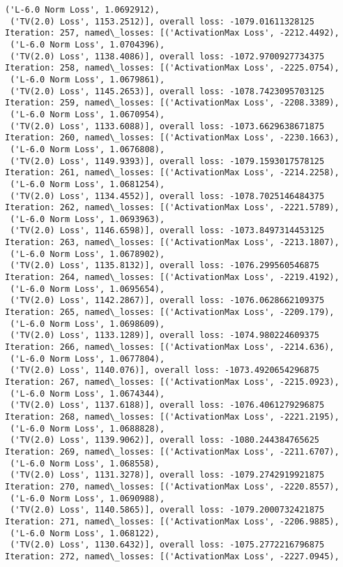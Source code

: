 \documentclass[10pt]{article}
\begin{document}
\begin{Verbatim}[commandchars=\\\{\}]
 ('L-6.0 Norm Loss', 1.0692912),
 ('TV(2.0) Loss', 1153.2512)], overall loss: -1079.01611328125
Iteration: 257, named\_losses: [('ActivationMax Loss', -2212.4492),
 ('L-6.0 Norm Loss', 1.0704396),
 ('TV(2.0) Loss', 1138.4086)], overall loss: -1072.9700927734375
Iteration: 258, named\_losses: [('ActivationMax Loss', -2225.0754),
 ('L-6.0 Norm Loss', 1.0679861),
 ('TV(2.0) Loss', 1145.2653)], overall loss: -1078.7423095703125
Iteration: 259, named\_losses: [('ActivationMax Loss', -2208.3389),
 ('L-6.0 Norm Loss', 1.0670954),
 ('TV(2.0) Loss', 1133.6088)], overall loss: -1073.6629638671875
Iteration: 260, named\_losses: [('ActivationMax Loss', -2230.1663),
 ('L-6.0 Norm Loss', 1.0676808),
 ('TV(2.0) Loss', 1149.9393)], overall loss: -1079.1593017578125
Iteration: 261, named\_losses: [('ActivationMax Loss', -2214.2258),
 ('L-6.0 Norm Loss', 1.0681254),
 ('TV(2.0) Loss', 1134.4552)], overall loss: -1078.7025146484375
Iteration: 262, named\_losses: [('ActivationMax Loss', -2221.5789),
 ('L-6.0 Norm Loss', 1.0693963),
 ('TV(2.0) Loss', 1146.6598)], overall loss: -1073.8497314453125
Iteration: 263, named\_losses: [('ActivationMax Loss', -2213.1807),
 ('L-6.0 Norm Loss', 1.0678902),
 ('TV(2.0) Loss', 1135.8132)], overall loss: -1076.299560546875
Iteration: 264, named\_losses: [('ActivationMax Loss', -2219.4192),
 ('L-6.0 Norm Loss', 1.0695654),
 ('TV(2.0) Loss', 1142.2867)], overall loss: -1076.0628662109375
Iteration: 265, named\_losses: [('ActivationMax Loss', -2209.179),
 ('L-6.0 Norm Loss', 1.0698609),
 ('TV(2.0) Loss', 1133.1289)], overall loss: -1074.980224609375
Iteration: 266, named\_losses: [('ActivationMax Loss', -2214.636),
 ('L-6.0 Norm Loss', 1.0677804),
 ('TV(2.0) Loss', 1140.076)], overall loss: -1073.4920654296875
Iteration: 267, named\_losses: [('ActivationMax Loss', -2215.0923),
 ('L-6.0 Norm Loss', 1.0674344),
 ('TV(2.0) Loss', 1137.6188)], overall loss: -1076.4061279296875
Iteration: 268, named\_losses: [('ActivationMax Loss', -2221.2195),
 ('L-6.0 Norm Loss', 1.0688828),
 ('TV(2.0) Loss', 1139.9062)], overall loss: -1080.244384765625
Iteration: 269, named\_losses: [('ActivationMax Loss', -2211.6707),
 ('L-6.0 Norm Loss', 1.068558),
 ('TV(2.0) Loss', 1131.3278)], overall loss: -1079.2742919921875
Iteration: 270, named\_losses: [('ActivationMax Loss', -2220.8557),
 ('L-6.0 Norm Loss', 1.0690988),
 ('TV(2.0) Loss', 1140.5865)], overall loss: -1079.2000732421875
Iteration: 271, named\_losses: [('ActivationMax Loss', -2206.9885),
 ('L-6.0 Norm Loss', 1.068122),
 ('TV(2.0) Loss', 1130.6432)], overall loss: -1075.2772216796875
Iteration: 272, named\_losses: [('ActivationMax Loss', -2227.0945),

\end{Verbatim}
\end{document}
